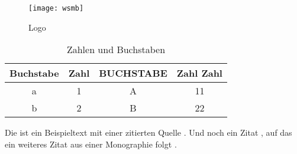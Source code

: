 	\begin{figure}[h]
		\centering
		\texttt{[image: wsmb]}		
		\caption{Logo }
	\end{figure}

\begin{table}[h]
	\centering
	\begin{tabular}{cccc}
		\toprule
		Buchstabe &Zahl &BUCHSTABE &Zahl Zahl \\\midrule
		a &1 &A &11 \\
		b &2 &B &22 \\\bottomrule
	\end{tabular}
	\caption{Zahlen und Buchstaben}
\end{table}

Die ist ein Beispieltext mit einer zitierten Quelle \cite{Blomeke.2006}. Und noch ein Zitat \cite{Hering.2007}, auf das ein weiteres Zitat aus einer Monographie folgt \cite[23]{Karmasin.2012}.

